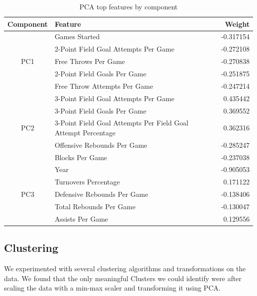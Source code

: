 \begin{table}[htb]
  \centering
  \caption{PCA top features by component}%
  \label{tab:pca-weights}
  \begin{tabular}{clr}
    \toprule
    \textbf{Component}   & \textbf{Feature}                                              & \textbf{Weight} \\
    \midrule
    \multirow{5}{*}{PC1} & Games Started                                                 & -0.317154       \\
                         & 2-Point Field Goal Attempts Per Game                          & -0.272108       \\
                         & Free Throws Per Game                                          & -0.270838       \\
                         & 2-Point Field Goals Per Game                                  & -0.251875       \\
                         & Free Throw Attempts Per Game                                  & -0.247214       \\
                         \midrule
    \multirow{5}{*}{PC2} & 3-Point Field Goal Attempts Per Game                          & 0.435442        \\
                         & 3-Point Field Goals Per Game                                  & 0.369552        \\
                         & 3-Point Field Goal Attempts Per Field Goal Attempt Percentage & 0.362316        \\
                         & Offensive Rebounds Per Game                                   & -0.285247       \\
                         & Blocks Per Game                                               & -0.237038       \\
                         \midrule
    \multirow{5}{*}{PC3} & Year                                                          & -0.905053       \\
                         & Turnovers Percentage                                          & 0.171122        \\
                         & Defensive Rebounds Per Game                                   & -0.138406       \\
                         & Total Rebounds Per Game                                       & -0.130047       \\
                         & Assists Per Game                                              & 0.129556        \\
    \bottomrule
  \end{tabular}
\end{table}

\subsection{Clustering}%
\label{sub:clustering}

We experimented with several clustering algorithms and transformations on the data. We
found that the only meaningful Clusters we could identify were after scaling the data with
a min-max scaler and transforming it using PCA.
